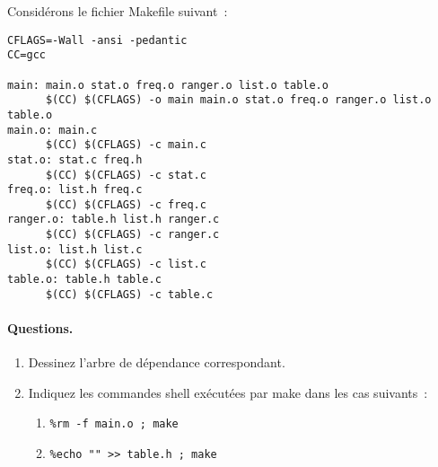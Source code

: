 Consid\'erons le fichier Makefile suivant~:
\begin{verbatim}
CFLAGS=-Wall -ansi -pedantic
CC=gcc

main: main.o stat.o freq.o ranger.o list.o table.o
      $(CC) $(CFLAGS) -o main main.o stat.o freq.o ranger.o list.o table.o
main.o: main.c
      $(CC) $(CFLAGS) -c main.c
stat.o: stat.c freq.h
      $(CC) $(CFLAGS) -c stat.c
freq.o: list.h freq.c 
      $(CC) $(CFLAGS) -c freq.c
ranger.o: table.h list.h ranger.c 
      $(CC) $(CFLAGS) -c ranger.c
list.o: list.h list.c 
      $(CC) $(CFLAGS) -c list.c
table.o: table.h table.c 
      $(CC) $(CFLAGS) -c table.c
\end{verbatim}
\paragraph{Questions.}
\begin{enumerate}
\item Dessinez l'arbre de d\'ependance correspondant.
\item Indiquez les commandes shell ex\'ecut\'ees par make dans les cas
  suivants~:
  \begin{enumerate}
  \item\verb+%rm -f main.o ; make+
  \item\verb+%echo "" >> table.h ; make+ 
  \end{enumerate}
\end{enumerate}

